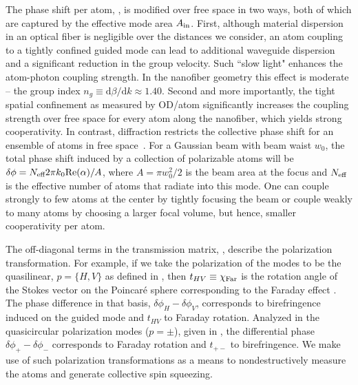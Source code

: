 \documentclass[preprint, aps,pra,onecolumn]{revtex4-1} %
\newcommand{\comment}[1]{{\color{Maroon} #1}}
\begin{document}
The phase shift per atom, , is modified over free space in two ways, both of which are captured by the effective mode area $A_{\rm in}$. 
First, although material dispersion in an optical fiber is negligible over the distances we consider, an atom coupling to a tightly confined guided mode can lead to additional waveguide dispersion and a significant reduction in the group velocity.  
Such ``slow light" enhances the atom-photon coupling strength. 
In the nanofiber geometry this effect is moderate -- \comment{the group index $n_g \equiv \mathrm{d}\beta/\mathrm{d}k\approx 1.40$}. 
Second and more importantly, the tight spatial confinement as measured by OD/atom significantly increases the coupling strength over free space for every atom along the nanofiber, which yields strong cooperativity.
In contrast, diffraction restricts the collective phase shift for an ensemble of atoms in free space~\cite{tanji-suzuki_chapter_2011, baragiola_three-dimensional_2014}.  
For a Gaussian beam with beam waist $w_0$, the total phase shift induced by a collection of polarizable atoms will be $\delta \phi = N_{\text{eff}} 2 \pi k_0 {\rm Re}({\alpha})/A$, where $A = \pi w^2_0/2$ is the beam area at the focus and $N_{\text{eff}}$ is the effective number of atoms that radiate into this mode.  
One can couple strongly to few atoms at the center by tightly focusing the beam or couple weakly to many atoms by choosing a larger focal volume, but hence, smaller cooperativity per atom.  

The off-diagonal terms in the transmission matrix, , describe the polarization transformation. For example, if we take the polarization of the modes to be the quasilinear, $p = \{H,V\}$ as defined in , then $t_{HV} \equiv \chi_{\rm Far}$ is the rotation angle of the Stokes vector on the Poincar\'{e} sphere corresponding to the Faraday effect \cite{hammerer_quantum_2010, deutsch_quantum_2010}.  
The phase difference in that basis, $\delta  \phi_H - \delta \phi_V$, corresponds to birefringence induced on the guided mode and $t_{HV}$ to Faraday rotation.  
Analyzed in the quasicircular polarization modes ($p=\pm$), given in , the differential phase $\delta \phi_+ -\delta  \phi_-$ corresponds to Faraday rotation and $t_{+-}$ to birefringence.  
We make use of such polarization transformations as a means to nondestructively measure the atoms and generate collective spin squeezing.


\end{document}
